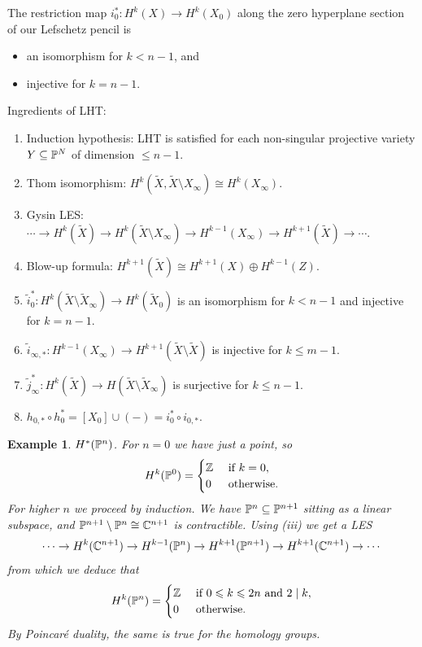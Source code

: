 \documentclass[A4paper, british]{amsart}
\theoremstyle{darkgreentheorem}
\theoremstyle{darkbluedefinition}
\theoremstyle{darkredexample}
\newtheorem{exa}[thm]{Example}
\theoremstyle{remark}
\newcommand{\1}{\mathbbm{1}}
\newcommand{\op}{\oplus}
\newcommand{\sub}{\subseteq}
\begin{document}
The restriction map $i_{0}^{*}\colon H^{k}(X)\to H^{k}(X_{0})$ along the zero hyperplane section of our Lefschetz pencil is
\begin{itemize}
    \item an isomorphism for $k<n-1$, and
    \item injective for $k=n-1$.
\end{itemize}

Ingredients of LHT:
\begin{enumerate}[label=(\roman*)]
    \item Induction hypothesis: LHT is satisfied for each non-singular projective variety $Y\sub \P^{N}$ of dimension $\leqslant n-1$.
    \item Thom isomorphism: $H^{k}(\tilde{X},\tilde{X}\setminus X_{\infty})\cong H^{k}(X_{\infty})$.
    \item Gysin LES: $\cdots \to H^{k}(\tilde{X})\to H^{k}(\tilde{X}\setminus X_{\infty})\to H^{k-1}(X_{\infty})\to H^{k+1}(\tilde{X})\to \cdots $.
    \item Blow-up formula: $H^{k+1}(\tilde{X})\cong H^{k+1}(X)\op H^{k-1}(Z)$.
    \item $\tilde{i}_{0}^{*}\colon H^{k}(\tilde{X}\setminus \tilde{X}_{\infty})\to H^{k}(\tilde{X}_{0})$ is an isomorphism for $k<n-1$ and injective for $k=n-1$.
    \item $\tilde{i}_{\infty,*}\colon H^{k-1}(X_{\infty})\to H^{k+1}(\tilde{X}\setminus \tilde{X})$ is injective for $k\leqslant m-1$.
    \item $\tilde{j}_{\infty}^{*}\colon H^{k}(\tilde{X})\to H(\tilde{X}\setminus \tilde{X}_{\infty})$ is surjective for $k\leqslant n-1$.
    \item $h_{0,*}\circ h_{0}^{*}=[X_{0}]\cup (-)=i_{0}^{*}\circ i_{0,*}$.
\end{enumerate}

\begin{exa}
    $H^{*}(\P^{n})$.
    For $n=0$ we have just a point, so
    \[ H^{k}(\P^{0})=\begin{cases}
	\Z & \text{ if } k=0, \\
	0 & \text{ otherwise}.
    \end{cases}
    \]
    For higher $n$ we proceed by induction.
    We have $\P^{n}\sub \P^{n+1}$ sitting as a linear subspace, and $\P^{n+1}\setminus \P^{n}\cong \C^{n+1}$ is contractible.
    Using (iii) we get a LES
    \[ \cdots \to H^{k}(\C^{n+1})\to H^{k-1}(\P^{n})\to H^{k+1}(\P^{n+1})\to H^{k+1}(\C^{n+1}) \to \cdots \]
    from which we deduce that
    \[ H^{k}(\P^{n})=\begin{cases}
	\Z &\text{ if }0\leqslant k\leqslant 2n \text{ and } 2\mid k, \\
	0 & \text{ otherwise}.
    \end{cases}
    \]
    By Poincaré duality, the same is true for the homology groups.
\end{exa}
\end{document}
